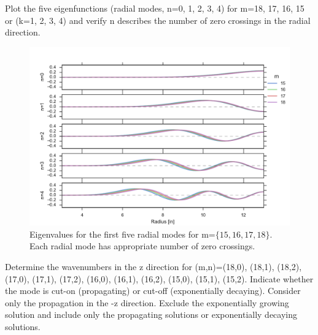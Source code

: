 \documentclass[onecolumn,10pt]{jhwhw}
\begin{document}
\clearpage
\problem{[20 points]}
Plot the five eigenfunctions (radial modes, n=0, 1, 2, 3, 4) for m=18, 17, 16, 15 or (k=1, 2, 3, 4) and verify n describes the number of zero crossings in the radial direction.

\begin{figure}[h]
  \centering
  \includegraphics[width=\textwidth]{figs/problem2.pdf}%
  \caption{Eigenvalues for the first five radial modes for m=$\{15, 16, 17, 18\}$. Each radial mode has appropriate number of zero crossings.}%
\end{figure}

\clearpage
\problem{[20 points]}
Determine the wavenumbers in the z direction for (m,n)=(18,0), (18,1), (18,2), (17,0), (17,1), (17,2), (16,0), (16,1), (16,2), (15,0), (15,1), (15,2). Indicate whether the mode is cut-on (propagating) or cut-off (exponentially decaying). Consider only the propagation in the -z direction. Exclude the exponentially growing solution and include only the propagating solutions or exponentially decaying solutions.
\end{document}
